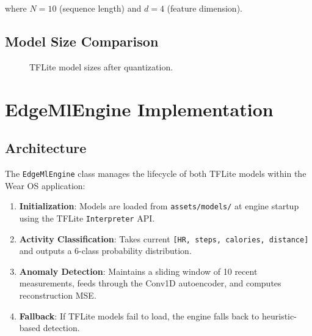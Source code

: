 \documentclass[conference]{IEEEtran}
\begin{document}
where $N = 10$ (sequence length) and $d = 4$ (feature dimension).

\subsection{Model Size Comparison}

\begin{figure}[H]
\centering
{}
\caption{TFLite model sizes after quantization.}
\label{fig:model_sizes}
\end{figure}

\section{EdgeMlEngine Implementation}

\subsection{Architecture}
The \texttt{EdgeMlEngine} class manages the lifecycle of both TFLite models within the Wear OS application:

\begin{enumerate}
    \item \textbf{Initialization}: Models are loaded from \texttt{assets/models/} at engine startup using the TFLite \texttt{Interpreter} API.
    \item \textbf{Activity Classification}: Takes current \texttt{[HR, steps, calories, distance]} and outputs a 6-class probability distribution.
    \item \textbf{Anomaly Detection}: Maintains a sliding window of 10 recent measurements, feeds through the Conv1D autoencoder, and computes reconstruction MSE.
    \item \textbf{Fallback}: If TFLite models fail to load, the engine falls back to heuristic-based detection.
\end{enumerate}
\end{document}

